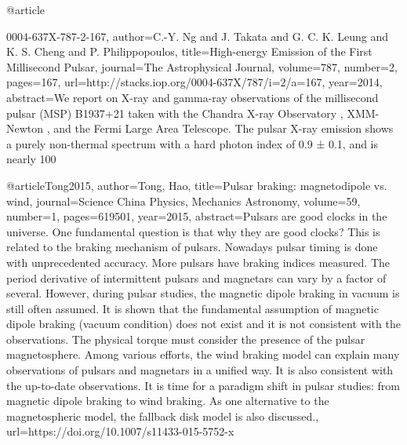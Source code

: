 @article{0004-637X-787-2-167,
  author={C.-Y. Ng and J. Takata and G. C. K. Leung and K. S. Cheng and P. Philippopoulos},
  title={High-energy Emission of the First Millisecond Pulsar},
  journal={The Astrophysical Journal},
  volume={787},
  number={2},
  pages={167},
  url={http://stacks.iop.org/0004-637X/787/i=2/a=167},
  year={2014},
  abstract={We report on X-ray and gamma-ray observations of the millisecond pulsar (MSP) B1937+21 taken with the Chandra X-ray Observatory , XMM-Newton , and the Fermi Large Area Telescope. The pulsar X-ray emission shows a purely non-thermal spectrum with a hard photon index of 0.9 ± 0.1, and is nearly 100%
}


@article{Tong2015,
  author={Tong, Hao},
  title={Pulsar braking: magnetodipole vs. wind},
  journal={Science China Physics, Mechanics Astronomy},
  volume={59},
  number={1},
  pages={619501},
  year={2015},
  abstract={Pulsars are good clocks in the universe. One fundamental question is that why they are good clocks? This is related to the braking mechanism of pulsars. Nowadays pulsar timing is done with unprecedented accuracy. More pulsars have braking indices measured. The period derivative of intermittent pulsars and magnetars can vary by a factor of several. However, during pulsar studies, the magnetic dipole braking in vacuum is still often assumed. It is shown that the fundamental assumption of magnetic dipole braking (vacuum condition) does not exist and it is not consistent with the observations. The physical torque must consider the presence of the pulsar magnetosphere. Among various efforts, the wind braking model can explain many observations of pulsars and magnetars in a unified way. It is also consistent with the up-to-date observations. It is time for a paradigm shift in pulsar studies: from magnetic dipole braking to wind braking. As one alternative to the magnetospheric model, the fallback disk model is also discussed.},
  url={https://doi.org/10.1007/s11433-015-5752-x}
}

}
